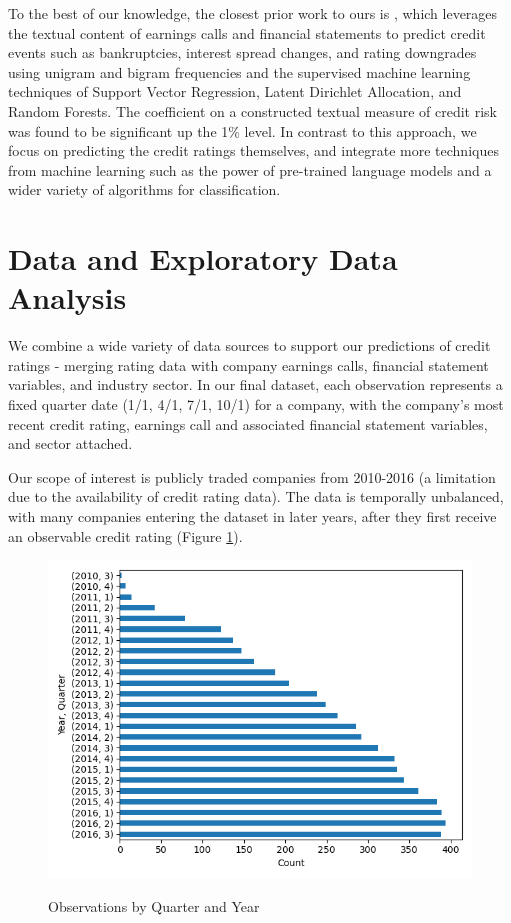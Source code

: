 \documentclass{article}[11pt]
\begin{document}
    To the best of our knowledge, the closest prior work to ours is \cite{donovan_measuring_2021}, which leverages the textual content of earnings calls and financial statements to predict credit events such as bankruptcies, interest spread changes, and rating downgrades using unigram and bigram frequencies and the supervised machine learning techniques of Support Vector Regression, Latent Dirichlet Allocation, and Random Forests. The coefficient on a constructed textual measure of credit risk was found to be significant up the 1\% level. In contrast to this approach, we focus on predicting the credit ratings themselves, and integrate more techniques from machine learning such as the power of pre-trained language models and a wider variety of algorithms for classification.

    \section*{Data and Exploratory Data Analysis}

    We combine a wide variety of data sources to support our predictions of credit ratings - merging rating data with company earnings calls, financial statement variables, and industry sector. In our final dataset, each observation represents a fixed quarter date (1/1, 4/1, 7/1, 10/1) for a company, with the company's most recent credit rating, earnings call and associated financial statement variables, and sector attached.

    Our scope of interest is publicly traded companies from 2010-2016 (a limitation due to the availability of credit rating data). The data is temporally unbalanced, with many companies entering the dataset in later years, after they first receive an observable credit rating (Figure \ref{fig:obs-by-quarter-year}).

    \begin{figure}[h!]
		\centering
        \caption{Observations by Quarter and Year}
        \includegraphics[width=0.6\linewidth,keepaspectratio=true]{../Output/All Data EDA/Tabular EDA/all_data_fixed_quarter_dates_obs_by_year_quarter_no_title.png}
        \label{fig:obs-by-quarter-year}
	\end{figure}
\end{document}
